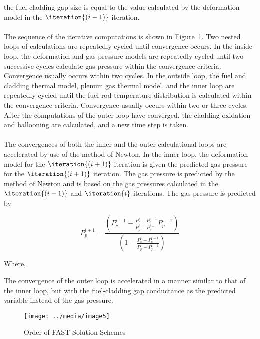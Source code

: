 the fuel-cladding gap size is equal to the value calculated by the deformation model in the
\(\iteration{(i-1)}\) iteration.
\\
\\
The sequence of the iterative computations is shown in Figure~\ref{fig:FAST-soln-scheme}. Two nested
loops of calculations are repeatedly cycled until convergence occurs. In the inside loop, the
deformation and gas pressure models are repeatedly cycled until two successive cycles calculate gas
pressure within the convergence criteria. Convergence usually occurs within two cycles. In the
outside loop, the fuel and cladding thermal model, plenum gas thermal model, and the inner loop are
repeatedly cycled until the fuel rod temperature distribution is calculated within the convergence
criteria. Convergence usually occurs within two or three cycles. After the computations of the outer
loop have converged, the cladding oxidation and ballooning are calculated, and a new time step is
taken.
\\
\\
The convergences of both the inner and the outer calculational loops are accelerated by use of the
method of Newton. In the inner loop, the deformation model for the $\iteration{(i+1)}$ iteration is
given the predicted gas pressure for the $\iteration{(i+1)}$ iteration. The gas pressure is
predicted by the method of Newton and is based on the gas pressures calculated in the
$\iteration{(i-1)}$ and $\iteration{i}$ iterations. The gas pressure is predicted by

\begin{equation}
    \label{eq:gas_pressure_iteration_scheme}
    P_{p}^{i + 1} = \frac{\left( P_{c}^{i - 1} - \frac{P_{c}^{i} - P_{c}^{i - 1}}{P_{p}^{i} - P_{p}^{i - 1}}P_{p}^{i - 1} \right)}{\left( 1 - \frac{P_{c}^{i} - P_{c}^{i - 1}}{P_{p}^{i} - P_{p}^{i - 1}} \right)}
\end{equation}

Where,

The convergence of the outer loop is accelerated in a manner similar to that of the inner loop, but
with the fuel-cladding gap conductance as the predicted variable instead of the gas pressure.

\begin{figure}
    \centering
    \texttt{[image: ../media/image5]}
    \caption{Order of FAST Solution Schemes}
    \label{fig:FAST-soln-scheme}
\end{figure}
